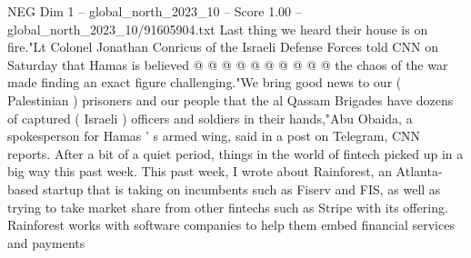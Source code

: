 \begin{textsample}{NEG Dim 1 – global\_north\_2023\_10 – Score 1.00 – global\_north\_2023\_10/91605904.txt}
Last thing we heard their house is on fire."Lt Colonel Jonathan Conricus of the Israeli Defense Forces told CNN on Saturday that Hamas is believed @ @ @ @ @ @ @ @ @ @ the chaos of the war made finding an exact figure challenging."We bring good news to our ( Palestinian ) prisoners and our people that the al Qassam Brigades have dozens of captured ( Israeli ) officers and soldiers in their hands,"Abu Obaida, a spokesperson for Hamas ' s armed wing, said in a post on Telegram, CNN reports.
After a bit of a quiet period, things in the world of fintech picked up in a big way this past week.
This past week, I wrote about Rainforest, an Atlanta-based startup that is taking on incumbents such as Fiserv and FIS, as well as trying to take market share from other fintechs such as Stripe with its offering.
Rainforest works with software companies to help them embed financial services and payments

\end{textsample}

